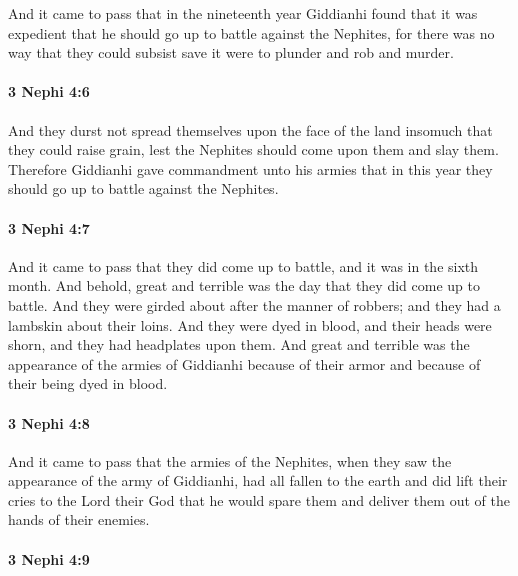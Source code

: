 			And it came to pass that in the nineteenth year
			Giddianhi found that it was expedient
			that he should go up to battle against the Nephites,
			for there was no way that they could subsist
			save it were to plunder and rob and murder.

		\paragraph{3 Nephi 4:6} %
			\label{3NEPHI-4-6}

			And they durst not spread themselves upon the face of the land
			insomuch that they could raise grain,
			lest the Nephites should come upon them and slay them.
			Therefore Giddianhi gave commandment unto his armies
			that in this year they should go up to battle against the Nephites.

		\paragraph{3 Nephi 4:7} %
			\label{3NEPHI-4-7}

			And it came to pass that they did come up to battle,
			and it was in the sixth month.
			And behold, great and terrible was the day that they did come up to battle.
			And they were girded about after the manner of robbers;
			and they had a lambskin about their loins.
			And they were dyed in blood,
			and their heads were shorn,
			and they had headplates upon them.
			And great and terrible was the appearance of the armies of Giddianhi
			because of their armor and because of their being dyed in blood.

		\paragraph{3 Nephi 4:8} %
			\label{3NEPHI-4-8}

			And it came to pass that the armies of the Nephites,
			when they saw the appearance of the army of Giddianhi,
			had all fallen to the earth and did lift their cries to the Lord their God
			that he would spare them and deliver them out of the hands of their enemies.

		\paragraph{3 Nephi 4:9} %
			\label{3NEPHI-4-9}

